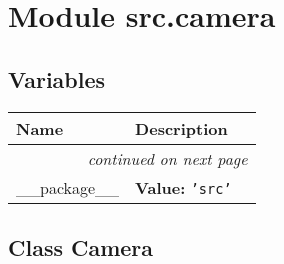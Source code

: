 %
%
%


\section{Module src.camera}

    \label{src:camera}


  \subsection{Variables}

    \vspace{-1cm}
\hspace{\varindent}\begin{longtable}{|p{\varnamewidth}|p{\vardescrwidth}|l}
\cline{1-2}
\cline{1-2} \centering \textbf{Name} & \centering \textbf{Description}& \\
\cline{1-2}
\endhead\cline{1-2}\multicolumn{3}{r}{\small\textit{continued on next page}}\\\endfoot\cline{1-2}
\endlastfoot\raggedright \_\-\_\-p\-a\-c\-k\-a\-g\-e\-\_\-\_\- & \raggedright \textbf{Value:} 
{\tt \texttt{'}\texttt{src}\texttt{'}}&\\
\cline{1-2}
\end{longtable}



\subsection{Class Camera}

